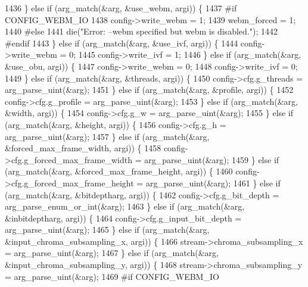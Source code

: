 \begin{DoxyCodeInclude}
{{{{{{{{{{{{{{{{1436     \} \textcolor{keywordflow}{else} \textcolor{keywordflow}{if} (arg\_match(&arg, &use\_webm, argi)) \{
1437 \textcolor{preprocessor}{#if CONFIG\_WEBM\_IO}
1438       config->write\_webm = 1;
1439       webm\_forced = 1;
1440 \textcolor{preprocessor}{#else}
1441       die(\textcolor{stringliteral}{"Error: --webm specified but webm is disabled."});
1442 \textcolor{preprocessor}{#endif}
1443     \} \textcolor{keywordflow}{else} \textcolor{keywordflow}{if} (arg\_match(&arg, &use\_ivf, argi)) \{
1444       config->write\_webm = 0;
1445       config->write\_ivf = 1;
1446     \} \textcolor{keywordflow}{else} \textcolor{keywordflow}{if} (arg\_match(&arg, &use\_obu, argi)) \{
1447       config->write\_webm = 0;
1448       config->write\_ivf = 0;
1449     \} \textcolor{keywordflow}{else} \textcolor{keywordflow}{if} (arg\_match(&arg, &threads, argi)) \{
1450       config->cfg.g\_threads = arg\_parse\_uint(&arg);
1451     \} \textcolor{keywordflow}{else} \textcolor{keywordflow}{if} (arg\_match(&arg, &profile, argi)) \{
1452       config->cfg.g\_profile = arg\_parse\_uint(&arg);
1453     \} \textcolor{keywordflow}{else} \textcolor{keywordflow}{if} (arg\_match(&arg, &width, argi)) \{
1454       config->cfg.g\_w = arg\_parse\_uint(&arg);
1455     \} \textcolor{keywordflow}{else} \textcolor{keywordflow}{if} (arg\_match(&arg, &height, argi)) \{
1456       config->cfg.g\_h = arg\_parse\_uint(&arg);
1457     \} \textcolor{keywordflow}{else} \textcolor{keywordflow}{if} (arg\_match(&arg, &forced\_max\_frame\_width, argi)) \{
1458       config->cfg.g\_forced\_max\_frame\_width = arg\_parse\_uint(&arg);
1459     \} \textcolor{keywordflow}{else} \textcolor{keywordflow}{if} (arg\_match(&arg, &forced\_max\_frame\_height, argi)) \{
1460       config->cfg.g\_forced\_max\_frame\_height = arg\_parse\_uint(&arg);
1461     \} \textcolor{keywordflow}{else} \textcolor{keywordflow}{if} (arg\_match(&arg, &bitdeptharg, argi)) \{
1462       config->cfg.g\_bit\_depth = arg\_parse\_enum\_or\_int(&arg);
1463     \} \textcolor{keywordflow}{else} \textcolor{keywordflow}{if} (arg\_match(&arg, &inbitdeptharg, argi)) \{
1464       config->cfg.g\_input\_bit\_depth = arg\_parse\_uint(&arg);
1465     \} \textcolor{keywordflow}{else} \textcolor{keywordflow}{if} (arg\_match(&arg, &input\_chroma\_subsampling\_x, argi)) \{
1466       stream->chroma\_subsampling\_x = arg\_parse\_uint(&arg);
1467     \} \textcolor{keywordflow}{else} \textcolor{keywordflow}{if} (arg\_match(&arg, &input\_chroma\_subsampling\_y, argi)) \{
1468       stream->chroma\_subsampling\_y = arg\_parse\_uint(&arg);
1469 \textcolor{preprocessor}{#if CONFIG\_WEBM\_IO}
}}}}}}}}}}}}}}}}
\end{DoxyCodeInclude}
